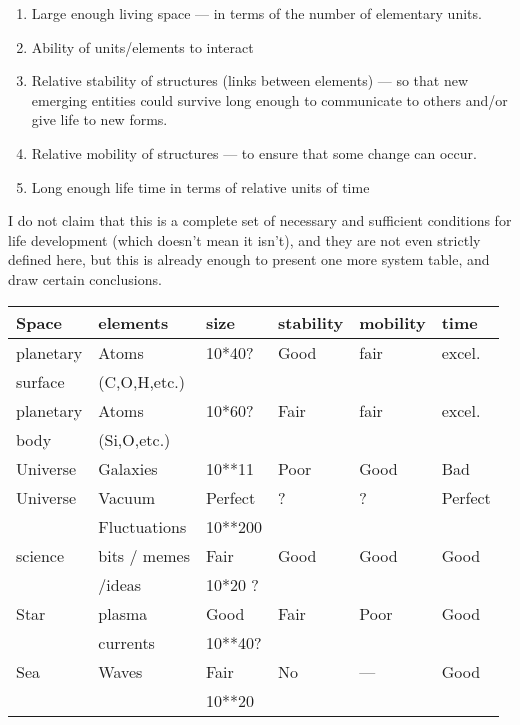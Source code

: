 \begin{enumerate}
     \item Large enough  living  space  ---  in  terms  of  the  number  of
elementary units.

     \item Ability of units/elements to interact

     \item Relative stability of structures (links between elements) --- so
that new emerging entities could survive long enough to communicate to
others and/or give life to new forms.

     \item Relative mobility of structures --- to ensure that  some  change
can occur.

     \item Long enough life time in terms of relative units of time
\end{enumerate}

     I do not claim that this is  a  complete  set  of  necessary  and
sufficient  conditions  for  life  development  (which doesn't mean it
isn't), and they are not even  strictly  defined  here,  but  this  is
already  enough  to  present  one  more system table, and draw certain
conclusions.

\vspace{5mm}
\begin{tabular}{|l|l|l|l|l|l|} \hline
 Space     &   elements  &  size   &stability& mobility  &  time  \\ \hline\hline
 planetary & Atoms       & 10*40?  & Good    & fair      & excel. \\
 surface   & (C,O,H,etc.)&         &         &           &        \\ \hline
 planetary & Atoms       & 10*60?  & Fair    & fair      & excel. \\
 body      & (Si,O,etc.) &         &         &           &        \\ \hline
 Universe  & Galaxies    & 10**11  & Poor    & Good      &  Bad   \\ \hline
 Universe  & Vacuum      & Perfect &  ?      &   ?       & Perfect\\
           &Fluctuations & 10**200 &         &           &        \\ \hline
 science   & bits / memes& Fair    &  Good   & Good      & Good   \\
           &     /ideas  & 10*20 ? &         &           &        \\ \hline
 Star      &  plasma     & Good    &  Fair   & Poor      & Good   \\
           &  currents   & 10**40? &         &           &        \\ \hline
 Sea       & Waves       & Fair    &  No     & ---       & Good   \\
           &             & 10**20  &         &           &        \\ \hline
\end{tabular}


